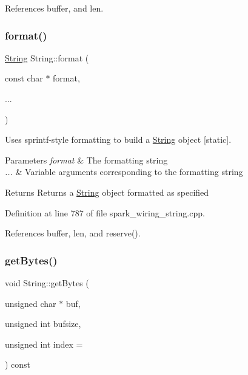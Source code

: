 References buffer, and len.

\mbox{\label{class_string_a0d717afd6f0ea29cc70175886b56fbd8}} 
\subsubsection{\texorpdfstring{format()}{format()}}
{\footnotesize\ttfamily \hyperlink{class_string}{String} String\+::format (\begin{DoxyParamCaption}\item[{const char $\ast$}]{format,  }\item[{}]{... }\end{DoxyParamCaption})\hspace{0.3cm}{\ttfamily [static]}}



Uses sprintf-\/style formatting to build a \hyperlink{class_string}{String} object \mbox{[}static\mbox{]}. 


\begin{DoxyParams}{Parameters}
{\em format} & The formatting string\\
\hline
{\em ...} & Variable arguments corresponding to the formatting string\\
\hline
\end{DoxyParams}
\begin{DoxyReturn}{Returns}
Returns a \hyperlink{class_string}{String} object formatted as specified 
\end{DoxyReturn}


Definition at line 787 of file spark\+\_\+wiring\+\_\+string.\+cpp.



References buffer, len, and reserve().

\mbox{\label{class_string_a507250e2de463e60e8df8fb5089f8dae}} 
\subsubsection{\texorpdfstring{get\+Bytes()}{getBytes()}}
{\footnotesize\ttfamily void String\+::get\+Bytes (\begin{DoxyParamCaption}\item[{unsigned char $\ast$}]{buf,  }\item[{unsigned int}]{bufsize,  }\item[{unsigned int}]{index = {} }\end{DoxyParamCaption}) const}



